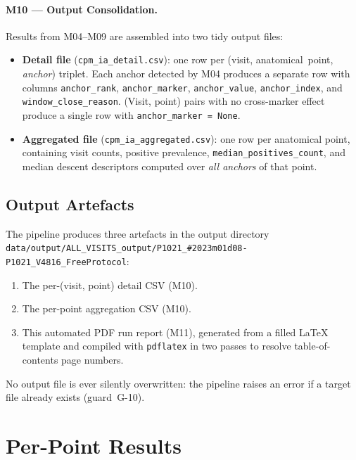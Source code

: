 \documentclass[a4paper,11pt]{article}
\begin{document}
\paragraph{M10 --- Output Consolidation.}
Results from M04--M09 are assembled into two tidy output files:
\begin{itemize}
  \item \textbf{Detail file} (\texttt{cpm\_ia\_detail.csv}): one row per
        (visit, anatomical~point, \emph{anchor}) triplet. Each anchor detected by M04
        produces a separate row with columns \texttt{anchor\_rank},
        \texttt{anchor\_marker}, \texttt{anchor\_value}, \texttt{anchor\_index},
        and \texttt{window\_close\_reason}.
        (Visit, point) pairs with no cross-marker effect produce a single row with
        \texttt{anchor\_marker = None}.
  \item \textbf{Aggregated file} (\texttt{cpm\_ia\_aggregated.csv}): one row per
        anatomical point, containing visit counts, positive prevalence,
        \texttt{median\_positives\_count}, and median descent descriptors computed over
        \emph{all anchors} of that point.
\end{itemize}

\subsection{Output Artefacts}

The pipeline produces three artefacts in the output directory \texttt{data/output/ALL\_VISITS\_output/P1021\_\#2023m01d08-P1021\_V4816\_FreeProtocol}:
\begin{enumerate}
  \item The per-(visit, point) detail CSV (M10).
  \item The per-point aggregation CSV (M10).
  \item This automated PDF run report (M11), generated from a filled \LaTeX{} template
        and compiled with \texttt{pdflatex} in two passes to resolve table-of-contents
        page numbers.
\end{enumerate}
No output file is ever silently overwritten: the pipeline raises an error if a target
file already exists (guard~G-10).

\section{Per-Point Results}
\end{document}
